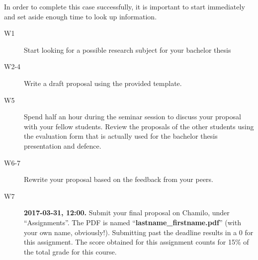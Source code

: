 \documentclass[fleqn,10pt]{artikeltin}
\begin{document}
In order to complete this case successfully, it is important to start immediately and set aside enough time to look up information.

\begin{description}
  \item[W1] Start looking for a possible research subject for your bachelor thesis
  \item[W2-4] Write a draft proposal using the provided template.
  \item[W5] Spend half an hour during the seminar session to discuss your proposal with your fellow students. Review the proposals of the other students using the evaluation form that is actually used for the bachelor thesis presentation and defence.
  \item[W6-7] Rewrite your proposal based on the feedback from your peers.
  \item[W7] \textbf{2017-03-31, 12:00.} Submit your final proposal on Chamilo, under ``Assignments''. The PDF is named ``\textbf{lastname\_firstname.pdf}'' (with your own name, obviously!). Submitting past the deadline results in a 0 for this assignment. The score obtained for this assignment counts for 15\% of the total grade for this course.
\end{description}
\end{document}
